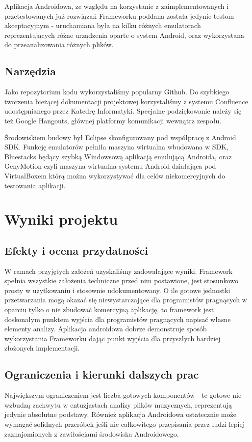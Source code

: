 Aplikacja Androidowa, ze względu na korzystanie z zaimplementowanych i przetestowanych już rozwiązań Frameworku poddana została jedynie testom akceptacyjnym - uruchamiana była na kilku różnych emulatorach reprezentujących różne urządzenia oparte o system Android, oraz wykorzystana do przeanalizowania różnych plików.
\section{Narzędzia}
Jako repozytorium kodu wykorzystaliśmy popularny Github. Do szybkiego tworzenia bieżącej dokumentacji projektowej korzystaliśmy z systemu Confluence udostępnianego przez Katedrę Informatyki. Specjalne podziękowanie należy się też Google Hangouts, głównej platformy komunikacji wewnątrz zespołu.

Środowiskiem budowy był Eclipse skonfigurowany pod współpracę z Android SDK. Funkcję emulatorów pełniła maszyna wirtualna wbudowana w SDK, Bluestacks będący szybką Windowsową aplikacją emulującą Androida, oraz GenyMotion czyli maszyna wirtualna systemu Android działająca pod VirtualBoxem którą można wykorzystywać dla celów niekomercyjnych do testowania aplikacji.

\chapter{Wyniki projektu}
\section{Efekty i ocena przydatności}
W ramach przyjętych założeń uzyskaliśmy zadowalające wyniki. Framework spełnia wszystkie założenia techniczne przed nim postawione, jest stosunkowo prosty w użytkowaniu i stosownie udokumentowany. O ile gotowe jednostki przetwarzania mogą okazać się niewystarczające dla programistów pragnących w oparciu tylko o nie zbudować komercyjną aplikację, to framework jest doskonałym punktem wyjścia dla programistów pragnących napisać własne elementy analizy. Aplikacja androidowa dobrze demonstruje sposób wykorzystania Frameworku dając punkt wyjścia dla przyszłych bardziej złożonych implementacji.

\section{Ograniczenia i kierunki dalszych prac}
Największym ograniczeniem jest liczba gotowych komponentów - te gotowe nie wzbudzą zachwytu w entuzjastach analizy plików muzycznych, reprezentują jedynie absolutne podstawy. Również aplikacja Androidowa ostatecznie może wymagać solidnych przeróbek jeśli nie całkowitego przepisania przez ludzi lepiej zaznajomionych z zawiłościami środowiska Androidowego.

\nocite{*}

